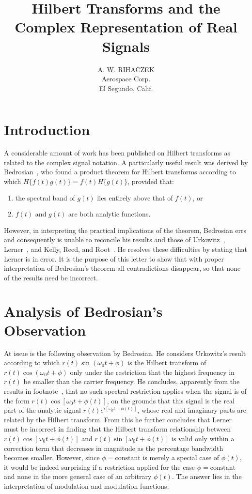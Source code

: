 \documentclass[11pt]{article}
\title{Hilbert Transforms and the Complex Representation of Real Signals}
\author{A. W. RIHACZEK\\
Aerospace Corp.\\
El Segundo, Calif.}
\date{}
\begin{document}
\maketitle

\section{Introduction}
\label{sec:introduction}

A considerable amount of work has been published on Hilbert transforms as related to the complex signal notation. A particularly useful result was derived by Bedrosian~\cite{bedrosian1963}, who found a product theorem for Hilbert transforms according to which $H\{f(t)g(t)\} = f(t)H\{g(t)\}$, provided that:
\begin{enumerate}
\item the spectral band of $g(t)$ lies entirely above that of $f(t)$, or
\item $f(t)$ and $g(t)$ are both analytic functions.
\end{enumerate}

However, in interpreting the practical implications of the theorem, Bedrosian errs and consequently is unable to reconcile his results and those of Urkowitz~\cite{urkowitz1962}, Lerner~\cite{lerner1960}, and Kelly, Reed, and Root~\cite{kelly1960}. He resolves these difficulties by stating that Lerner is in error. It is the purpose of this letter to show that with proper interpretation of Bedrosian's theorem all contradictions disappear, so that none of the results need be incorrect.

\section{Analysis of Bedrosian's Observation}
\label{sec:bedrosian_analysis}

At issue is the following observation by Bedrosian. He considers Urkowitz's result according to which $r(t) \sin(\omega_0 t + \phi)$ is the Hilbert transform of $r(t) \cos(\omega_0 t + \phi)$ only under the restriction that the highest frequency in $r(t)$ be smaller than the carrier frequency. He concludes, apparently from the results in footnote~\cite{bedrosian1963}, that no such spectral restriction applies when the signal is of the form $r(t) \cos[\omega_0 t + \phi(t)]$, on the grounds that this signal is the real part of the analytic signal $r(t)e^{i[\omega_0 t + \phi(t)]}$, whose real and imaginary parts are related by the Hilbert transform. From this he further concludes that Lerner must be incorrect in finding that the Hilbert transform relationship between $r(t) \cos[\omega_0 t + \phi(t)]$ and $r(t) \sin[\omega_0 t + \phi(t)]$ is valid only within a correction term that decreases in magnitude as the percentage bandwidth becomes smaller. However, since $\phi = \text{constant}$ is merely a special case of $\phi(t)$, it would be indeed surprising if a restriction applied for the case $\phi = \text{constant}$ and none in the more general case of an arbitrary $\phi(t)$. The answer lies in the interpretation of modulation and modulation functions.
\end{document}
